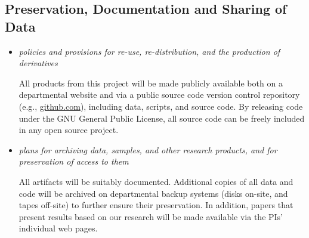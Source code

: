 \subsection*{Preservation, Documentation and Sharing of Data}

\begin{itemize}
\item \emph{policies and provisions for re-use, re-distribution, and the production of derivatives}

All products from this project will be made publicly available both on
a departmental website and via a public source code version control
repository (e.g., \url{github.com}), including data, scripts, and source
code. By releasing code under the GNU General Public License, all
source code can be freely included in any open source project.

\item \emph{plans for archiving data, samples, and other research products, and for preservation of access to them}

All artifacts will be suitably documented. Additional copies of all
data and code will be archived on departmental backup systems (disks
on-site, and tapes off-site) to further ensure their preservation. In
addition, papers that present results based on our research will be
made available via the PIs' individual web pages.

\end{itemize}



